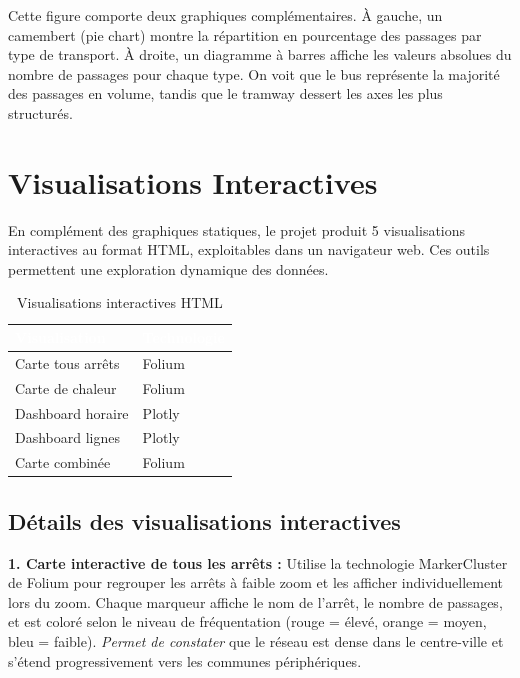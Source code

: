 \documentclass[12pt,a4paper]{article}
\begin{document}
Cette figure comporte deux graphiques complémentaires. À gauche, un camembert (pie chart) montre la répartition en pourcentage des passages par type de transport. À droite, un diagramme à barres affiche les valeurs absolues du nombre de passages pour chaque type. On voit que le bus représente la majorité des passages en volume, tandis que le tramway dessert les axes les plus structurés.

\newpage
\section{Visualisations Interactives}

En complément des graphiques statiques, le projet produit 5 visualisations interactives au format HTML, exploitables dans un navigateur web. Ces outils permettent une exploration dynamique des données.

\begin{table}[H]
\centering
\begin{tabular}{|l|l|}
\hline
\rowcolor{bleuTBM} \textcolor{white}{\textbf{Visualisation}} & \textcolor{white}{\textbf{Technologie}} \\
\hline
Carte tous arrêts & Folium \\
\hline
\rowcolor{grisClair} Carte de chaleur & Folium \\
\hline
Dashboard horaire & Plotly \\
\hline
\rowcolor{grisClair} Dashboard lignes & Plotly \\
\hline
Carte combinée & Folium \\
\hline
\end{tabular}
\caption{Visualisations interactives HTML}
\end{table}

\subsection{Détails des visualisations interactives}

\textbf{1. Carte interactive de tous les arrêts :} Utilise la technologie MarkerCluster de Folium pour regrouper les arrêts à faible zoom et les afficher individuellement lors du zoom. Chaque marqueur affiche le nom de l'arrêt, le nombre de passages, et est coloré selon le niveau de fréquentation (rouge = élevé, orange = moyen, bleu = faible). \textit{Permet de constater} que le réseau est dense dans le centre-ville et s'étend progressivement vers les communes périphériques.
\end{document}
